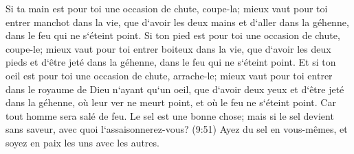 \verse Si ta main est pour toi une occasion de chute, coupe-la; mieux vaut pour toi entrer manchot dans la vie, 
\verse que d`avoir les deux mains et d`aller dans la géhenne, dans le feu qui ne s`éteint point. 
\verse Si ton pied est pour toi une occasion de chute, coupe-le; mieux vaut pour toi entrer boiteux dans la vie, 
\verse que d`avoir les deux pieds et d`être jeté dans la géhenne, dans le feu qui ne s`éteint point. 
\verse Et si ton oeil est pour toi une occasion de chute, arrache-le; mieux vaut pour toi entrer dans le royaume de Dieu n`ayant qu`un oeil, que d`avoir deux yeux et d`être jeté dans la géhenne, 
\verse où leur ver ne meurt point, et où le feu ne s`éteint point. 
\verse Car tout homme sera salé de feu. 
\verse Le sel est une bonne chose; mais si le sel devient sans saveur, avec quoi l`assaisonnerez-vous? (9:51) Ayez du sel en vous-mêmes, et soyez en paix les uns avec les autres. 

